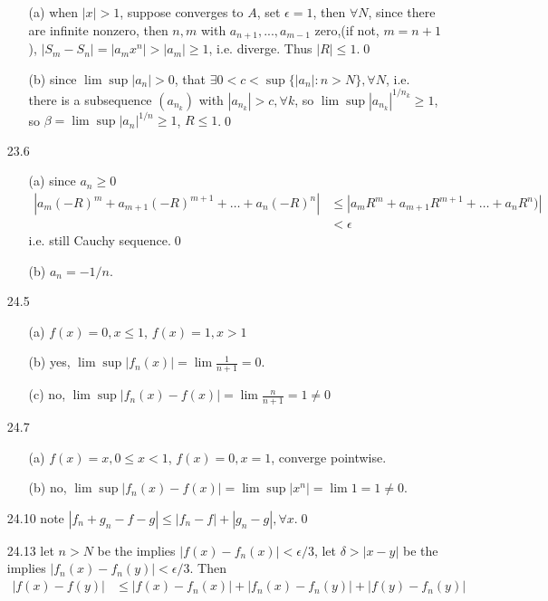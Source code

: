 \documentclass[paper=a4, fontsize=11pt]{scrartcl} %
\numberwithin{equation}{section} %
\numberwithin{figure}{section} %
\numberwithin{table}{section} %
\begin{document}
\begin{itemize}
\begin{itemize}
	\item[(a)] when $|x|>1$, suppose converges to $A$, set $\epsilon= 1$, then $\forall N$, since there are infinite nonzero, then $n,m$ with $a_{n+1},...,a_{m-1}$ zero,(if not, $m=n+1$), $|S_m-S_n| = |a_m x^n|>|a_m|\geq 1$, i.e. diverge. Thus $|R|\leq 1$.\qed
	\item[(b)] since $\lim\sup|a_n|>0$, that $\exists 0<c<\sup\{|a_n|:n>N\}, \forall N$, i.e. there is a subsequence $(a_{n_k})$ with $|a_{n_k}|>c,\forall k$, so $\lim\sup |a_{n_k}|^{1/n_k} \geq 1$, so $\beta =\lim\sup|a_n|^{1/n}\geq 1$, $R\leq 1$.\qed
	\end{itemize}
\item[23.6]\begin{itemize}
	\item[(a)] since $a_n\geq 0$
	\begin{equation}\begin{split}
	|a_m (-R)^m+a_{m+1}(-R)^{m+1}+\dots+a_n (-R)^n| &\leq |a_m R^m+a_{m+1}R^{m+1}+\dots+a_n R^n)|\\
	&<\epsilon
	\end{split}
	\end{equation}
	i.e. still Cauchy sequence.\qed
	\item[(b)] $a_n = -1/n$.
	\end{itemize}
\item[24.5] \begin{itemize}
	\item[(a)] $f(x)=0, x\leq 1$, $f(x)=1, x>1$
	\item[(b)] yes, $\lim\sup|f_n(x)|=\lim \frac{1}{n+1} = 0$.
	\item[(c)] no, $\lim\sup|f_n(x)-f(x)|= \lim\frac{n}{n+1} =1\neq 0$
	\end{itemize}
\item[24.7] \begin{itemize}
	\item[(a)] $f(x)=x, 0\leq x<1$, $f(x)=0, x=1$, converge pointwise.
	\item[(b)] no, $\lim\sup|f_n(x)-f(x)| = \lim \sup |x^n| = \lim 1 = 1\neq 0$. 
	\end{itemize}
\item[24.10] note $|f_n+g_n - f-g|\leq |f_n-f| + |g_n -g|, \forall x$.\qed\
\item[24.13] let $n>N$ be the implies $|f(x)-f_n(x)|<\epsilon/3$, let $\delta>|x-y|$ be the implies $|f_n(x)-f_n(y)|<\epsilon/3$. Then
\begin{equation}\begin{split}
	|f(x)-f(y)| &\leq |f(x)-f_n(x)| + |f_n(x)-f_n(y)| + |f(y)-f_n(y)| \\

\end{split}
\end{equation}
\end{itemize}
\end{document}
